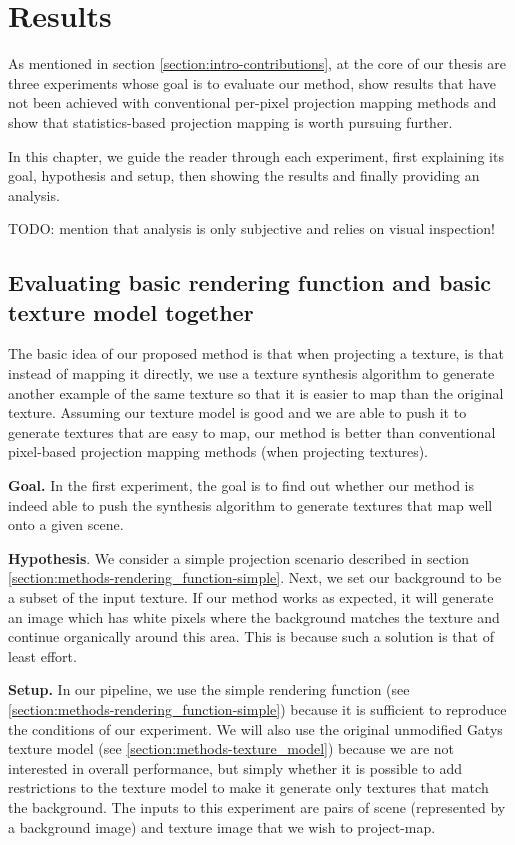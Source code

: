 \chapter{Results}
\label{chapter:results}

As mentioned in section \ref{section:intro-contributions}, at the core of our thesis are three experiments whose goal is to evaluate our method, show results that have not been achieved with conventional per-pixel projection mapping methods and show that statistics-based projection mapping is worth pursuing further.

In this chapter, we guide the reader through each experiment, first explaining its goal, hypothesis and setup, then showing the results and finally providing an analysis.

{\color{red} TODO: mention that analysis is only subjective and relies on visual inspection!}

\section{Evaluating basic rendering function and basic texture model together}
\label{section:results-experiments-01}

The basic idea of our proposed method is that when projecting a texture, is that instead of mapping it directly, we use a texture synthesis algorithm to generate another example of the same texture so that it is easier to map than the original texture. Assuming our texture model is good and we are able to push it to generate textures that are easy to map, our method is better than conventional pixel-based projection mapping methods (when projecting textures).

\textbf{Goal.} In the first experiment, the goal is to find out whether our method is indeed able to push the synthesis algorithm to generate textures that map well onto a given scene.

\textbf{Hypothesis}. We consider a simple projection scenario described in section \ref{section:methods-rendering_function-simple}. Next, we set our background to be a subset of the input texture. If our method works as expected, it will generate an image which has white pixels where the background matches the texture and continue organically around this area. This is because such a solution is that of least effort.

\textbf{Setup.} In our pipeline, we use the simple rendering function (see \ref{section:methods-rendering_function-simple}) because it is sufficient to reproduce the conditions of our experiment. We will also use the original unmodified Gatys texture model (see \ref{section:methods-texture_model}) because we are not interested in overall performance, but simply whether it is possible to add restrictions to the texture model to make it generate only textures that match the background. The inputs to this experiment are pairs of scene (represented by a background image) and texture image that we wish to project-map.

